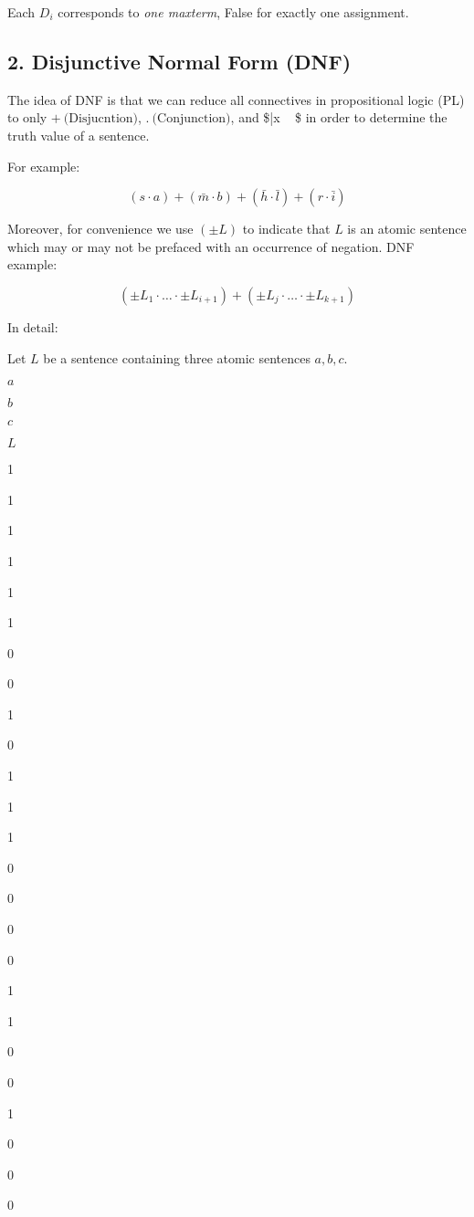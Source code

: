 Each \(D_i\) corresponds to \emph{one maxterm}, False for exactly one
assignment.

\subsection{2. Disjunctive Normal Form
(DNF)}\label{disjunctive-normal-form-dnf}

The idea of DNF is that we can reduce all connectives in propositional
logic (PL) to only \(+ \ \text{(Disjucntion)}\),
\(.\ \text{(Conjunction)}\), and \$\bar x ~ \$ in order
to determine the truth value of a sentence.

For example:

\[(s \cdot a) + (\bar m \cdot b) + (\bar h \cdot \bar l) + (r \cdot \bar i)\]

Moreover, for convenience we use \((\pm L)\) to indicate that \(L\) is
an atomic sentence which may or may not be prefaced with an occurrence
of negation. DNF example:

\[(\pm L_1 \cdot \dots \cdot \pm L_{i+1}) + (\pm L_j \cdot \dots \cdot \pm L_{k+1})\]

In detail:

Let \(L\) be a sentence containing three atomic sentences \(a, b, c\).

\(a\)

\(b\)

\(c\)

\(L\)

1

1

1

1

1

1

0

0

1

0

1

1

1

0

0

0

0

1

1

0

0

1

0

0

0


